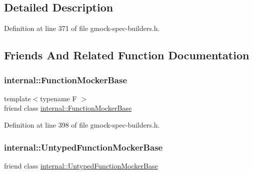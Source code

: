 \subsection{Detailed Description}


Definition at line 371 of file gmock-\/spec-\/builders.\+h.



\subsection{Friends And Related Function Documentation}
\mbox{\label{classtesting_1_1Mock_a1945aea400fdb50639e5cdf43c583687}} 
\subsubsection{\texorpdfstring{internal\+::\+Function\+Mocker\+Base}{internal::FunctionMockerBase}}
{\footnotesize\ttfamily template$<$typename F $>$ \\
friend class \hyperlink{classtesting_1_1internal_1_1FunctionMockerBase}{internal\+::\+Function\+Mocker\+Base}\hspace{0.3cm}{\ttfamily [friend]}}



Definition at line 398 of file gmock-\/spec-\/builders.\+h.

\mbox{\label{classtesting_1_1Mock_aa199ba5b2fe114afc42c43912a582feb}} 
\subsubsection{\texorpdfstring{internal\+::\+Untyped\+Function\+Mocker\+Base}{internal::UntypedFunctionMockerBase}}
{\footnotesize\ttfamily friend class \hyperlink{classtesting_1_1internal_1_1UntypedFunctionMockerBase}{internal\+::\+Untyped\+Function\+Mocker\+Base}\hspace{0.3cm}{\ttfamily [friend]}}



